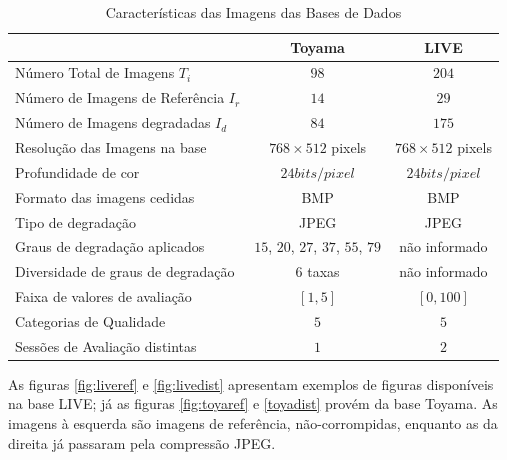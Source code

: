 \begin{table}[htb]
	\footnotesize
	\caption[Características das Imagens das Bases de Dados]{Características das Imagens das Bases de Dados}
	\label{tab:bds}
 	\begin{tabular}{ l | c | c } %
							&	\textbf{Toyama}			&	\textbf{LIVE} 		\\\hline %
		Número Total de Imagens	$T_i$		&	$98$				&	$204$	  		\\ %
		Número de Imagens de Referência $I_r$	& 	$14$				&	$29$		  	\\
		Número de Imagens degradadas $I_d$	&	$84$				&	$175$	  		\\
		Resolução das Imagens na base		& 	$768 \times 512$ pixels 		&	$768 \times 512$ pixels 	\\
		Profundidade de cor			&	$24bits/pixel$			&	$24bits/pixel$ 		\\
		Formato das imagens cedidas		&	BMP				&	BMP		  	\\
		Tipo de degradação			&	JPEG				&	JPEG		  	\\
		Graus de degradação aplicados		& $15$, $20$, $27$, $37$, $55$, $79$ 	& 	não informado 		\\
		Diversidade de graus de degradação	&	$6$ taxas			&  	não informado 		\\
		Faixa de valores de avaliação		& 	$[1, 5]$			& 	$[0, 100]$		\\
		Categorias de Qualidade			&	$5$				& 	$5$			\\
		Sessões de Avaliação distintas		&	$1$				& 	$2$			\\
		
	\end {tabular}\par
\end{table}

As figuras \autoref{fig:liveref} e \autoref{fig:livedist} apresentam exemplos de figuras disponíveis na base LIVE; já as figuras \autoref{fig:toyaref} e \autoref{toyadist} provém da base Toyama. As imagens à esquerda são imagens de referência, não-corrompidas, enquanto as da direita já passaram pela compressão JPEG.

